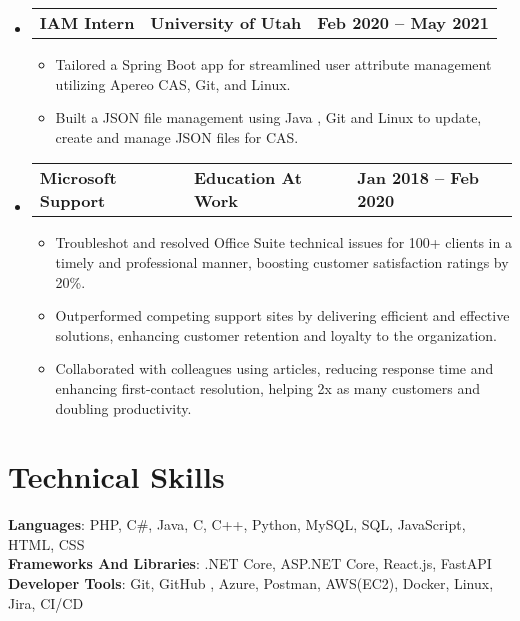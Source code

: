 \documentclass[letterpaper,11pt]{article}
\begin{document}
\begin{itemize}[leftmargin=0.05in, label={}]
	\item{
	            \begin{tabu} {X[l] X[c] X[r]}
		            \textbf{IAM Intern} & \textbf{University of Utah} & \textbf{Feb 2020 -- May 2021} \\
	            \end{tabu}

	            \begin{itemize}[label=$\bullet$]
		            \item{Tailored a Spring Boot app for streamlined user attribute management utilizing Apereo CAS, Git, and Linux.}
		            \item{Built a JSON file management using Java , Git and Linux to update, create and manage JSON files for CAS.}
	            \end{itemize}
	      }

	\item{
	            \begin{tabu} {X[l] X[c] X[r]}
		            \textbf{Microsoft Support} & \textbf{Education At Work} & \textbf{Jan 2018 -- Feb 2020} \\
	            \end{tabu}
	            \begin{itemize} [label=$\bullet$]
		            \item{Troubleshot and resolved Office Suite technical issues for 100+ clients in a timely and professional manner, boosting customer satisfaction ratings by 20\%.}
		            \item{Outperformed competing support sites by delivering efficient and effective solutions, enhancing customer retention and loyalty to the organization.}
		            \item{Collaborated with colleagues using articles, reducing response time and enhancing first-contact resolution, helping 2x as many customers and doubling productivity.}
	            \end{itemize}
	      }

\end{itemize}


\section{\textbf{Technical Skills}}
\begin{itemize}[leftmargin=0.05in, label={}]
	{\item{
		            \textbf{Languages}{: PHP, C\#, Java, C, C++, Python, MySQL, SQL, JavaScript, HTML, CSS} \\
		            \textbf{Frameworks And Libraries}{: .NET Core, ASP.NET Core, React.js, FastAPI} \\
		            \textbf{Developer Tools}{: Git, GitHub , Azure, Postman, AWS(EC2), Docker, Linux, Jira, CI/CD} \\
		      }}
\end{itemize}
\end{document}
